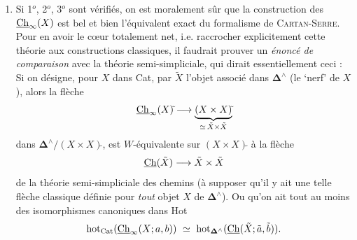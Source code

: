\begin{enumerate}[label={}, leftmargin=*]
\item[5$^o$)] Si 1$^o$, 2$^o$, 3$^o$ sont vérifiés, on est moralement sûr que la construction des $\underline{\mathrm{Ch}}_\infty(X)$ est bel et bien l'équivalent exact du formalisme de \textsc{Cartan-Serre}. Pour en avoir le c\oe ur totalement net, i.e. raccrocher explicitement cette théorie aux constructions classiques, il faudrait prouver un \textit{énoncé de comparaison} avec la théorie semi-simpliciale, qui dirait essentiellement ceci : Si on désigne, pour $X$ dans Cat, par $\tilde{X}$ l'objet associé dans $\mathbf{\Delta}^\wedge$ (le `nerf' de $X$), alors la flèche
\[
\underline{\mathrm{Ch}}_\infty(X)\tilde{}\longrightarrow\underbrace{(X\times X)\tilde{}}_{\simeq\,\tilde{X}\times\tilde{X}}
\]
dans $\mathbf{\Delta}^\wedge/(X\times X)\tilde{}$, est $W$-équivalente sur $(X\times X)\tilde{}$ à la flèche
\[
\underline{\mathrm{Ch}}(\tilde{X})\longrightarrow\tilde{X}\times\tilde{X}
\]
de la théorie semi-simpliciale des chemins (à supposer qu'il y ait une telle flèche classique définie pour \textit{tout} objet $X$ de $\mathbf{\Delta}^\wedge$). Ou qu'on ait tout au moins des isomorphismes canoniques dans Hot
\[
\hot_{\mathrm{Cat}}(\uCh_\infty(X;a,b))\ \simeq\ \hot_{\mathbf{\Delta}^\wedge}(\uCh(\tilde{X};\tilde{a},\tilde{b})).
\]
\end{enumerate}

